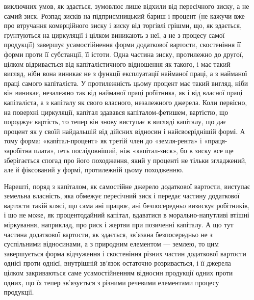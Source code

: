 \parcont{}  %
виключних умов, як здається, зумовлює лише відхили від пересічного зиску,
а не самий зиск. Розпад зисків на підприємницький бариш і процент (не кажучи
вже про втручання комерційного зиску і зиску від торгівлі грішми, що, як
здається, ґрунтуються на циркуляції і цілком виникають з неї, а не з процесу
самої продукції) завершує усамостійнення форми додаткової вартости, скостеніння
її форми проти її субстанції, її істоти. Одна частина зиску, протилежно до
другої, цілком відривається від капіталістичного відношення як такого, і має
такий вигляд, ніби вона виникає не з функції експлуатації найманої праці,
а з найманої праці самого капіталіста. У протилежність цьому процент має
такий вигляд, ніби він виникає, незалежно так від найманої праці робітника,
як і від власної праці капіталіста, а з капіталу як свого власного, незалежного
джерела. Коли первісно, на поверхні циркуляції, капітал здавався капіталом-фетишем,
вартістю, що породжує вартість, то тепер він знову виступає в вигляді
капіталу, що дає процент як у своїй найдальшій від дійсних відносин і
найсвоєріднішій формі. А тому форма: «капітал-процент» як третій член до
«земля-рента» і «праця-заробітна плата», геть послідовніший, ніж «капітал-зиск»,
бо в зиску все ще зберігається спогад про його походження, який у проценті
не тільки згладжений, але й фіксований у формі, протилежній цьому
походженню.

Нарешті, поряд з капіталом, як самостійне джерело додаткової вартости,
виступає земельна власність, яка обмежує пересічний зиск і передає частину
додаткової вартости такій клясі, що сама ані працює, ані безпосередньо визискує
робітників, і що не може, як процентодайний капітал, вдаватися в морально-напутливі
втішні міркування, наприклад, про риск і жертви при позиченні
капіталу. А що тут частина додаткової вартости, як здається, зв’язана безпосередньо
не з суспільними відносинами, а з природним елементом — землею, то цим
завершується форма відчуження і скостеніння різних частин додаткової вартости
однієї проти однієї, внутрішній зв’язок остаточно розривається, і її джерела
цілком закриваються саме усамостійненням відносин продукції одних проти одних,
що їх тепер зв’язується з різними речевими елементами процесу продукції.

